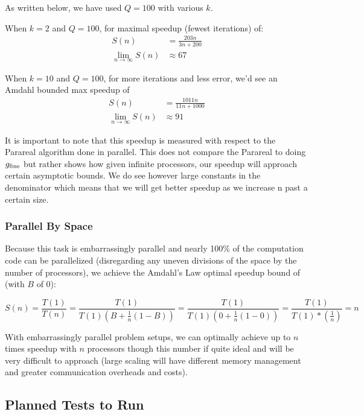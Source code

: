 \documentclass[letterpaper,12pt]{article}
\begin{document}
As written below, we have used $Q = 100$ with various $k$.

When $k = 2$ and $Q = 100$, for maximal speedup (fewest iterations) of:
\[
\begin{aligned}
S(n) &= \frac{203n}{3n+200} \\
\lim_{n\to \infty}S(n) &\approx 67
\end{aligned}
\]

When $k = 10$ and $Q = 100$, for more iterations and less error, we'd see an Amdahl bounded max speedup of 
\[
\begin{aligned}
S(n) &= \frac{1011n}{11n+1000} \\
\lim_{n\to \infty}S(n) &\approx 91
\end{aligned}
\]

It is important to note that this speedup is measured with respect to the Parareal algorithm done in parallel. This does not compare the Parareal to doing $g_{\textnormal{fine}}$ but rather shows how given infinite processors, our speedup will approach certain asymptotic bounds. We do see however large constants in the denominator which means that we will get better speedup as we increase n past a certain size.

\subsubsection{Parallel By Space}

Because this task is embarrassingly parallel and nearly 100\% of the computation code can be parallelized (disregarding any uneven divisions of the space by the number of processors), we achieve the Amdahl's Law optimal speedup bound of (with $B$ of 0):

\[
S(n) = \frac{T(1)}{T(n)} = \frac{T(1)}{ T(1) \left( B + \frac{1}{n} (1-B) \right)} = \frac{T(1)}{T(1) \left( 0 + \frac{1}{n} (1-0) \right)} = \frac{T(1)}{T(1) * \left( \frac{1}{n} \right) } = n
\]

With embarrassingly parallel problem setups, we can optimally achieve up to $n$ times speedup with $n$ processors though this number if quite ideal and will be very difficult to approach (large scaling will have different memory management and greater communication overheads and costs).

\subsection{Planned Tests to Run}
\end{document}
